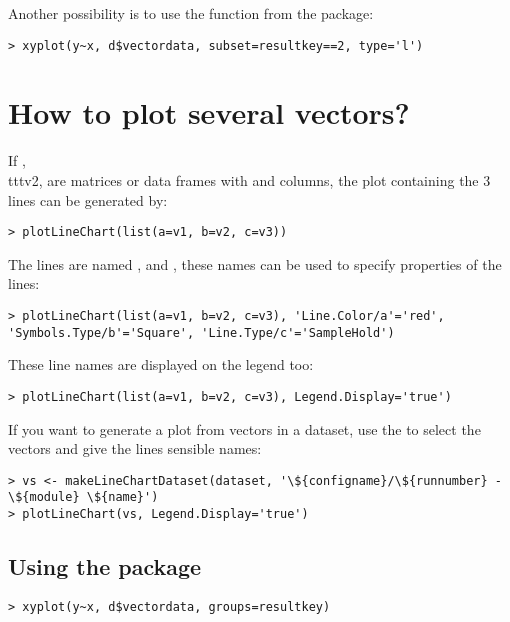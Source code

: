 Another possibility is to use the  function from the  package:

\begin{verbatim}
> xyplot(y~x, d$vectordata, subset=resultkey==2, type='l')
\end{verbatim}

\section{How to plot several vectors?}

If , \\ttt{v2},  are matrices or data frames with  and  columns,
the plot containing the 3 lines can be generated by:

\begin{verbatim}
> plotLineChart(list(a=v1, b=v2, c=v3))
\end{verbatim}

The lines are named ,  and , these names can be used to specify
properties of the lines:

\begin{verbatim}
> plotLineChart(list(a=v1, b=v2, c=v3), 'Line.Color/a'='red', 'Symbols.Type/b'='Square', 'Line.Type/c'='SampleHold')
\end{verbatim}

These line names are displayed on the legend too:

\begin{verbatim}
> plotLineChart(list(a=v1, b=v2, c=v3), Legend.Display='true')
\end{verbatim}

If you want to generate a plot from vectors in a dataset, use the  to select
the vectors and give the lines sensible names:

\begin{verbatim}
> vs <- makeLineChartDataset(dataset, '\${configname}/\${runnumber} - \${module} \${name}')
> plotLineChart(vs, Legend.Display='true')
\end{verbatim}

\subsection{Using the  package}

\begin{verbatim}
> xyplot(y~x, d$vectordata, groups=resultkey)
\end{verbatim}

